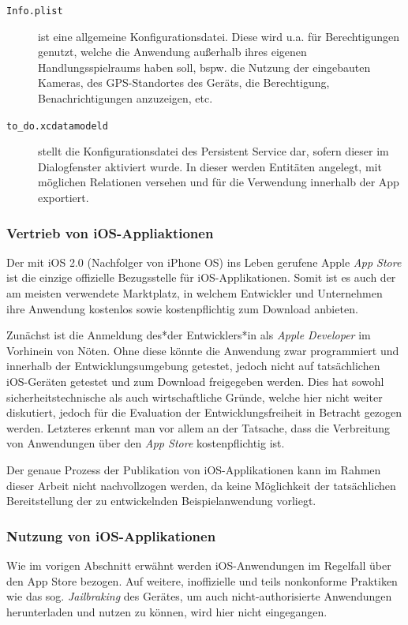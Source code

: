 \begin{description}
	\item[\texttt{Info.plist}] ist eine allgemeine Konfigurationsdatei. Diese wird u.a. für Berechtigungen genutzt, welche die Anwendung außerhalb ihres eigenen Handlungsspielraums haben soll, bspw. die Nutzung der eingebauten Kameras, des GPS-Standortes des Geräts, die Berechtigung, Benachrichtigungen anzuzeigen, etc.
	\item[\texttt{to\_do.xcdatamodeld}] stellt die Konfigurationsdatei des Persistent Service dar, sofern dieser im Dialogfenster aktiviert wurde. In dieser werden Entitäten angelegt, mit möglichen Relationen versehen und für die Verwendung innerhalb der App exportiert.
\end{description}

\subsubsection{Vertrieb von iOS-Appliaktionen}
Der mit iOS 2.0 (Nachfolger von iPhone OS) ins Leben gerufene Apple \textit{App Store} ist die einzige offizielle Bezugsstelle für iOS-Applikationen. Somit ist es auch der am meisten verwendete Marktplatz, in welchem Entwickler und Unternehmen ihre Anwendung kostenlos sowie kostenpflichtig zum Download anbieten.

Zunächst ist die Anmeldung des*der Entwicklers*in als \textit{Apple Developer} im Vorhinein von Nöten. Ohne diese könnte die Anwendung zwar programmiert und innerhalb der Entwicklungsumgebung getestet, jedoch nicht auf tatsächlichen iOS-Geräten getestet und zum Download freigegeben werden. Dies hat sowohl sicherheitstechnische als auch wirtschaftliche Gründe, welche hier nicht weiter diskutiert, jedoch für die Evaluation der Entwicklungsfreiheit in Betracht gezogen werden. Letzteres erkennt man vor allem an der Tatsache, dass die Verbreitung von Anwendungen über den \textit{App Store} kostenpflichtig ist.

Der genaue Prozess der Publikation von iOS-Applikationen kann im Rahmen dieser Arbeit nicht nachvollzogen werden, da keine Möglichkeit der tatsächlichen Bereitstellung der zu entwickelnden Beispielanwendung vorliegt.

\subsubsection{Nutzung von iOS-Applikationen}
Wie im vorigen Abschnitt erwähnt werden iOS-Anwendungen im Regelfall über den App Store bezogen. Auf weitere, inoffizielle und teils nonkonforme Praktiken wie das sog. \textit{Jailbraking} des Gerätes, um auch nicht-authorisierte Anwendungen herunterladen und nutzen zu können, wird hier nicht eingegangen.

